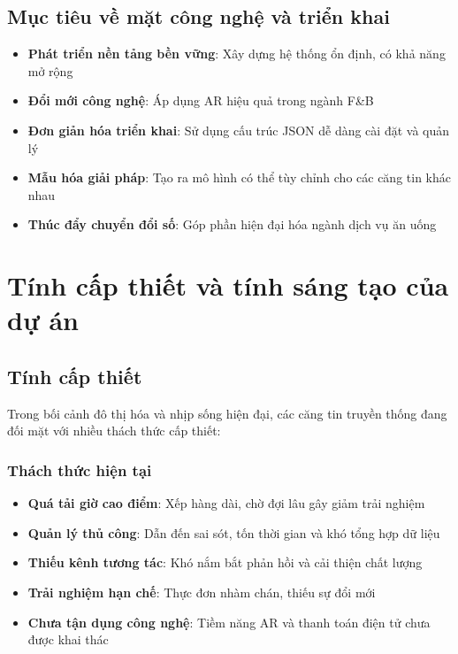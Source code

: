 \documentclass[12pt,a4paper]{article}
\begin{document}
\subsection{Mục tiêu về mặt công nghệ và triển khai}
\begin{itemize}[leftmargin=1cm]
    \item \textbf{Phát triển nền tảng bền vững}: Xây dựng hệ thống ổn định, có khả năng mở rộng
    \item \textbf{Đổi mới công nghệ}: Áp dụng AR hiệu quả trong ngành F\&B
    \item \textbf{Đơn giản hóa triển khai}: Sử dụng cấu trúc JSON dễ dàng cài đặt và quản lý
    \item \textbf{Mẫu hóa giải pháp}: Tạo ra mô hình có thể tùy chỉnh cho các căng tin khác nhau
    \item \textbf{Thúc đẩy chuyển đổi số}: Góp phần hiện đại hóa ngành dịch vụ ăn uống
\end{itemize}

\section{Tính cấp thiết và tính sáng tạo của dự án}

\subsection{Tính cấp thiết}
Trong bối cảnh đô thị hóa và nhịp sống hiện đại, các căng tin truyền thống đang đối mặt với nhiều thách thức cấp thiết:

\subsubsection{Thách thức hiện tại}
\begin{itemize}[leftmargin=1cm]
    \item \textbf{Quá tải giờ cao điểm}: Xếp hàng dài, chờ đợi lâu gây giảm trải nghiệm
    \item \textbf{Quản lý thủ công}: Dẫn đến sai sót, tốn thời gian và khó tổng hợp dữ liệu
    \item \textbf{Thiếu kênh tương tác}: Khó nắm bắt phản hồi và cải thiện chất lượng
    \item \textbf{Trải nghiệm hạn chế}: Thực đơn nhàm chán, thiếu sự đổi mới
    \item \textbf{Chưa tận dụng công nghệ}: Tiềm năng AR và thanh toán điện tử chưa được khai thác
\end{itemize}
\end{document}
